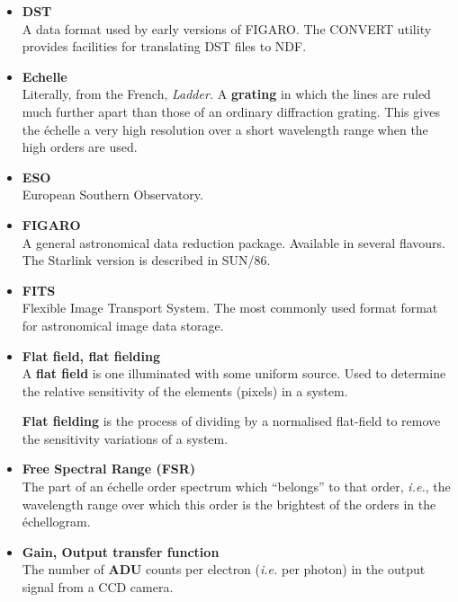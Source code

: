\documentclass[twoside,11pt]{article}
\newcommand{\htmladdnormallink}[2]{#1}
\newcommand{\htmlref}[2]{#1}
\newcommand{\xref}[3]{#1}
\begin{document}
\begin{itemize}
\item {\bf\label{gl_dst}DST}\\
      A data format used by early versions of \xref{FIGARO}{sun86}{}\@.
      The \xref{CONVERT}{sun55}{} utility provides facilities for
      translating DST files to NDF.

\item {\bf\label{gl_echelle}Echelle}\\
      Literally, from the French, {\sl Ladder.}
      A \htmlref{{\bf grating}}{gl_grating} in which the
      lines are ruled much further apart than those of an ordinary
      diffraction grating.  This gives the \'{e}chelle a very high
      resolution over a short wavelength range when the high orders are
      used.

\item {\bf\label{gl_eso}ESO}\\
      \htmladdnormallink{European Southern Observatory}
      {http://http.hq.eso.org/}.

\item {\bf\label{gl_figaro}FIGARO}\\
      A general astronomical data reduction package.  Available in
      several flavours.  The Starlink version is described in
      \xref{SUN/86}{sun86}{}.

\item {\bf\label{gl_fits}FITS}\\
      Flexible Image Transport System.  The most commonly used format
      format for astronomical image data storage.

\item {\bf\label{gl_flat_field}Flat field, flat fielding}\\
      A {\bf flat field} is one illuminated with some uniform source.
      Used to determine the relative sensitivity of the elements
      (pixels) in a system.

      {\bf Flat fielding} is the process of dividing by a normalised
      flat-field to remove the sensitivity variations of a system.

\item {\bf\label{gl_fsr}Free Spectral Range (FSR)}\\
      The part of an \'{e}chelle order spectrum which ``belongs'' to that
      order, {\it{i.e.}}, the wavelength range over which this order is the
      brightest of the orders in the \'{e}chellogram.

\item {\bf\label{gl_ccd_gain}Gain, Output transfer function}\\
      The number of \htmlref{{\bf ADU}}{gl_adu}
      counts per electron ({\it{i.e.}} per photon)
      in the output signal from a CCD camera.


\end{itemize}
\end{document}
